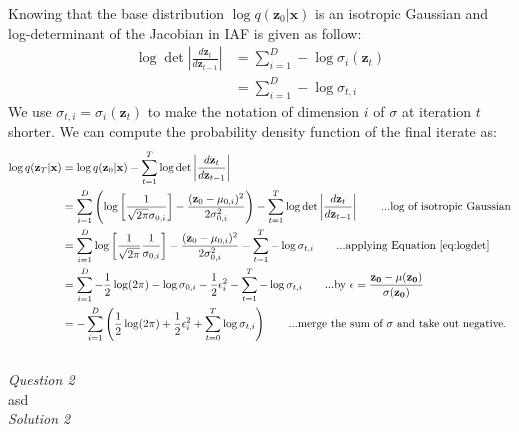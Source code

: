 \documentclass{article}
\begin{document}
Knowing that the base distribution $\log q(\mathbf{z}_0 | \mathbf{x})$ is an isotropic Gaussian and log-determinant of the Jacobian in IAF is given as follow:
\begin{align}
\log\det \left|\frac{d\mathbf{z}_t}{d\mathbf{z}_{t-1}}\right| &= \sum_{i=1}^{D} -\log \sigma_i(\mathbf{z}_{t})\\
&= \sum_{i=1}^{D} -\log \sigma_{t,i}
\label{eq:logdet}
\end{align}
We use $\sigma_{t,i} =  \sigma_i(\mathbf{z}_{t})$ to make the notation of dimension $i$ of $\sigma$ at iteration $t$ shorter. We can compute the probability density function of the final iterate as:
\begin{align*}
\log q(\mathbf{z}_T | \mathbf{x}) &= \log q(\mathbf{z}_0 | \mathbf{x}) - \sum_{t=1}^{T} \log\det \left|\frac{d\mathbf{z}_t}{d\mathbf{z}_{t-1}}\right|\\
 &= \sum_{i=1}^{D} \left(\log \left[\frac{1}{\sqrt{2\pi}\sigma_{0,i}}\right] - \frac{(\mathbf{z}_{0}-\mu_{0,i})^2}{2\sigma_{0,i}^2} \right) - \sum_{t=1}^{T} \log\det \left|\frac{d\mathbf{z}_t}{d\mathbf{z}_{t-1}}\right|		\text{\hspace{20pt}...log of isotropic Gaussian}\\
 &= \sum_{i=1}^{D}\log \left[\frac{1}{\sqrt{2\pi}}\frac{1}{\sigma_{0,i}}\right] - \frac{(\mathbf{z}_{0}-\mu_{0,i})^2}{2\sigma_{0,i}^2} - \sum_{t=1}^{T} -\log \sigma_{t,i}            \text{\hspace{20pt}...applying Equation~\ref{eq:logdet} }\\
 &= \sum_{i=1}^{D}- \frac{1}{2}\log(2\pi) - \log \sigma_{0,i} -  \frac{1}{2}  \epsilon_i^2 - \sum_{t=1}^{T} -\log \sigma_{t,i}            \text{\hspace{20pt}...by $\epsilon = \frac{\mathbf{z_0} - \mu(\mathbf{z_0})}{\sigma(\mathbf{z_0})}$}\\
 &= -\sum_{i=1}^{D} \left( \frac{1}{2}\log(2\pi) + \frac{1}{2}  \epsilon_i^2 + \sum_{t=0}^{T} \log \sigma_{t,i} \right)           \text{\hspace{20pt}...merge the sum of $\sigma$ and take out negative. }\\
\end{align*}
\\[3pt]


\noindent\emph{Question 2}
\\[3pt]
asd
\\[10pt]
\emph{Solution 2}
\\[3pt]
\end{document}
